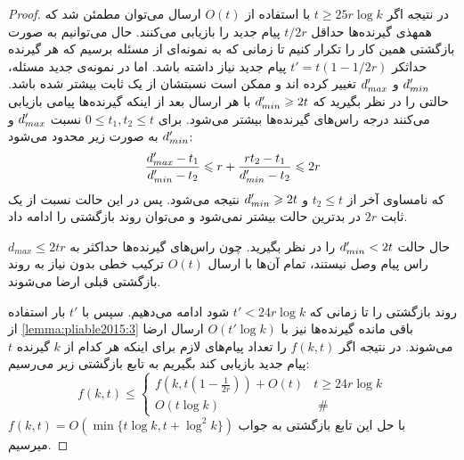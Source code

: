 \begin{proof}
	در نتیجه اگر
	$t \geq 25 r \log k$
	با استفاده از
	$O(t)$
	ارسال می‌توان مطمئن شد که همهذی گیرنده‌ها حداقل
	$t/2r$
	پیام جدید را بازیابی می‌کنند. حال می‌توانیم به صورت بازگشتی همین کار را تکرار کنیم تا زمانی که به نمونه‌ای از مسئله برسیم که هر گیرنده حداثکر
	$t' = t(1 - 1/2r)$
	پیام جدید نیاز داشته باشد. اما در نمونه‌ی جدید مسئله،
	$d_{min}'$
	و
	$d_{max}'$
	تغییر کرده اند و ممکن است نسبتشان از یک ثابت بیشتر شده باشد. حالتی را در نظر بگیرید که
	$d_{min}' \geqslant 2t$
	با هر ارسال بعد از اینکه گیرنده‌ها پیامی بازیابی می‌کنند درجه راس‌های گیرنده‌ها بیشتر می‌شود. برای
	$0 \leq t_1, t_2 \leq t$
	نسبت
	$d_{max}'$
	و
	$d_{min}'$
	به صورت زیر محدود می‌شود:
	\begin{equation}
		\dfrac{d_{max}' - t_1}{d_{min}' - t_2} \leqslant r + \dfrac{rt_2 - t_1}{d_{min}' - t_2} \leqslant 2r
	\end{equation}
	که نامساوی آخر از 
	$t_2 \leq t$
	و
	$d_{min}' \geqslant 2t$
	نتیجه می‌شود. پس در این حالت نسبت از یک ثابت
	$2r$
	در بدترین حالت بیشتر نمی‌شود و می‌توان روند بازگشتی را ادامه داد.
	
	حال حالت
	$d_{min}' < 2t$
	را در نظر بگیرید. چون راس‌های گیرنده‌ها حداکثر به
	$d_{max} \leq 2tr$
	راس پیام وصل نیستند، تمام آن‌ها با ارسال
	$O(t)$
	ترکیب خطی بدون نیاز به روند بازگشتی قبلی ارضا می‌شوند.
	
	روند بازگشتی را تا زمانی که
	$t' < 24r \log k$
	شود ادامه می‌دهیم. سپس با 
	$t'$
	بار استفاده از 
	\autoref{lemma:pliable2015:3}
	باقی مانده گیرنده‌ها نیز با
	$O(t' \log k)$
	ارسال ارضا می‌شوند. در نتیجه اگر
	$f(k, t)$
	را تعداد پیام‌های لازم برای اینکه هر کدام از
	$k$
	گیرنده
	$t$
	پیام جدید بازیابی کند بگیریم به تابع بازگشتی زیر می‌رسیم:
	\begin{equation}
		f(k, t) \leq \begin{cases}f\left(k, t\left(1-\frac{1}{2 r}\right)\right)+O(t) & t \geq 24 r \log k \\ O(t \log k) & \text { \# }\end{cases}
	\end{equation}
	با حل این تابع بازگشتی به جواب
	$f(k, t) = O(\min\{t \log k, t + \log^2 k\})$
	میرسیم.
\end{proof}

